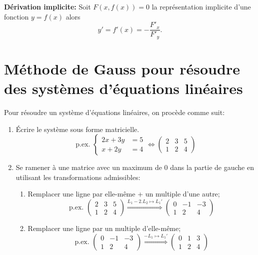 \textbf{Dérivation implicite:} Soit $F(x,f(x)) = 0$ la représentation implicite d'une fonction $y=f(x)$ alors \[y' = f'(x) = - \frac{F'_x}{F'_y}.\]

\section{Méthode de Gauss pour résoudre des systèmes d'équations linéaires}


Pour résoudre un système d'équations linéaires, on procède comme suit:
\begin{enumerate}
\item Écrire le système sous forme matricielle. \[\text{p.ex. } \begin{cases} 2x+3y &= 5 \\ x+2y &= 4 \end{cases} \Leftrightarrow \left(\begin{array}{cc|c} 2 & 3 & 5 \\ 1 & 2 & 4 \end{array}\right) \]
\item Se ramener à une matrice avec un maximum de $0$ dans la partie de gauche en utilisant les transformations admissibles:
\begin{enumerate}
\item Remplacer une ligne par elle-même + un multiple d'une autre;
\[\text{p.ex. } \left(\begin{array}{cc|c} 2 & 3 & 5 \\ 1 & 2 & 4 \end{array}\right)  \stackrel{L_1  - 2. L_2 \mapsto L_1'}{\Longrightarrow} \left(\begin{array}{cc|c} 0 & -1 & -3 \\ 1 & 2 & 4 \end{array}\right) \]
\item Remplacer une ligne par un multiple d'elle-même;
\[\text{p.ex. } \left(\begin{array}{cc|c} 0 & -1 & -3 \\ 1 & 2 & 4 \end{array}\right)  \stackrel{-L_1  \mapsto L_1'}{\Longrightarrow} \left(\begin{array}{cc|c} 0 & 1 & 3 \\ 1 & 2 & 4 \end{array}\right) \]

\end{enumerate}
\end{enumerate}
